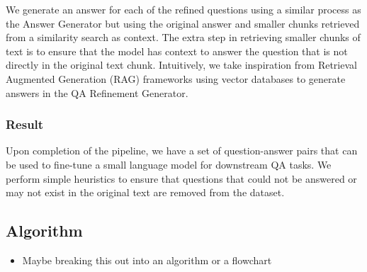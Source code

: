 We generate an answer for each of the refined questions using a similar process as the Answer Generator but using the original answer
and smaller chunks retrieved from a similarity search as context. The extra step in retrieving smaller chunks of text is to ensure that the model
has context to answer the question that is not directly in the original text chunk. Intuitively, we take inspiration from Retrieval Augmented Generation
(RAG) frameworks using vector databases to generate answers in the QA Refinement Generator.

\subsubsection{Result}

Upon completion of the pipeline, we have a set of question-answer pairs that can be used to fine-tune a small language model for downstream QA tasks.
We perform simple heuristics to ensure that questions that could not be answered or may not exist in the original text are removed from the dataset.

\subsection{Algorithm}
\begin{itemize}
  \item Maybe breaking this out into an algorithm or a flowchart
\end{itemize}
